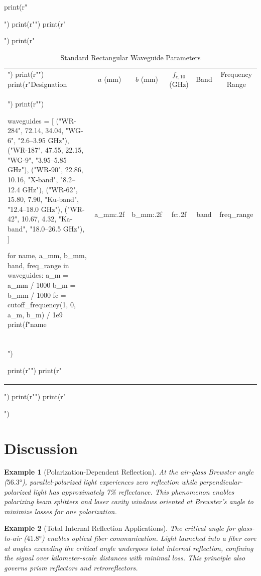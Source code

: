 \documentclass[a4paper, 11pt]{article}
\newtheorem{example}{Example}[section]
\begin{document}
\begin{pycode}
print(r"\begin{table}[htbp]")
print(r"\centering")
print(r"\caption{Standard Rectangular Waveguide Parameters}")
print(r"\begin{tabular}{lccccc}")
print(r"\toprule")
print(r"Designation & $a$ (mm) & $b$ (mm) & $f_{c,10}$ (GHz) & Band & Frequency Range \\")
print(r"\midrule")

waveguides = [
    ("WR-284", 72.14, 34.04, "WG-6", "2.6--3.95 GHz"),
    ("WR-187", 47.55, 22.15, "WG-9", "3.95--5.85 GHz"),
    ("WR-90", 22.86, 10.16, "X-band", "8.2--12.4 GHz"),
    ("WR-62", 15.80, 7.90, "Ku-band", "12.4--18.0 GHz"),
    ("WR-42", 10.67, 4.32, "Ka-band", "18.0--26.5 GHz"),
]

for name, a_mm, b_mm, band, freq_range in waveguides:
    a_m = a_mm / 1000
    b_m = b_mm / 1000
    fc = cutoff_frequency(1, 0, a_m, b_m) / 1e9
    print(f"{name} & {a_mm:.2f} & {b_mm:.2f} & {fc:.2f} & {band} & {freq_range} \\\\")

print(r"\bottomrule")
print(r"\end{tabular}")
print(r"\label{tab:waveguide}")
print(r"\end{table}")
\end{pycode}

\section{Discussion}

\begin{example}[Polarization-Dependent Reflection]
At the air-glass Brewster angle ($56.3°$), parallel-polarized light experiences zero
reflection while perpendicular-polarized light has approximately 7\% reflectance. This
phenomenon enables polarizing beam splitters and laser cavity windows oriented at
Brewster's angle to minimize losses for one polarization.
\end{example}

\begin{example}[Total Internal Reflection Applications]
The critical angle for glass-to-air ($41.8°$) enables optical fiber communication.
Light launched into a fiber core at angles exceeding the critical angle undergoes
total internal reflection, confining the signal over kilometer-scale distances with
minimal loss. This principle also governs prism reflectors and retroreflectors.
\end{example}
\end{document}
